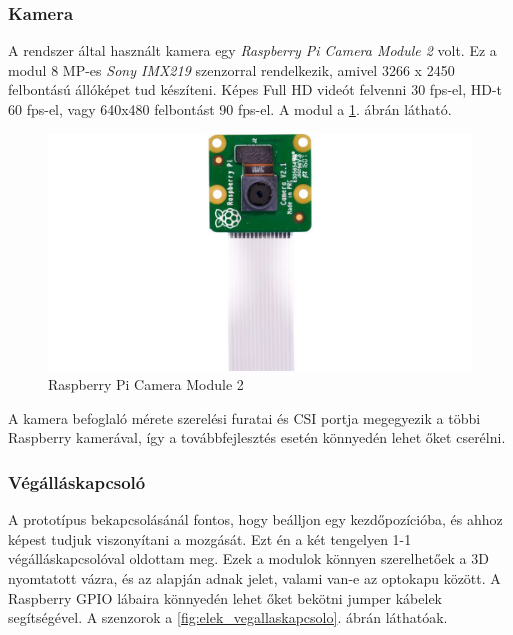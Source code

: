 \documentclass[12pt,a4paper]{article}
\begin{document}
\subsubsection*{Kamera}
A rendszer által használt kamera egy \textsl{Raspberry Pi Camera Module 2} volt.\cite{raspberrycam} Ez a modul 8 MP-es \textsl{Sony IMX219} szenzorral rendelkezik, amivel 3266 x 2450 felbontású állóképet tud készíteni. Képes Full HD videót felvenni 30 fps-el, HD-t 60 fps-el, vagy 640x480 felbontást 90 fps-el. A modul a \ref{fig:elek_raspberrycam}. ábrán látható.

\begin{figure}[h!]
	\centering
	\includegraphics[width=1\linewidth]{elek_raspberrycam}
	\caption{Raspberry Pi Camera Module 2}
	\label{fig:elek_raspberrycam}
\end{figure}

A kamera befoglaló mérete szerelési furatai és CSI portja megegyezik a többi Raspberry kamerával, így a továbbfejlesztés esetén könnyedén lehet őket cserélni.

\subsubsection*{Végálláskapcsoló}
A prototípus bekapcsolásánál fontos, hogy beálljon egy kezdőpozícióba, és ahhoz képest tudjuk viszonyítani a mozgását. Ezt én a két tengelyen 1-1 végálláskapcsolóval oldottam meg. Ezek a modulok könnyen szerelhetőek a 3D nyomtatott vázra, és az alapján adnak jelet, valami van-e az optokapu között. A Raspberry GPIO lábaira könnyedén lehet őket bekötni jumper kábelek segítségével. A szenzorok a \ref{fig:elek_vegallaskapcsolo}. ábrán láthatóak.
\end{document}
